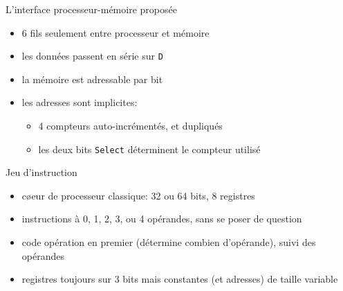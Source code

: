 \documentclass[slidetop,11pt,table]{beamer}
\begin{document}
\begin{frame}{L'interface processeur-mémoire proposée}
  \begin{figure}[b]
    \begin{center}
      \scalebox{0.8}{\proco}
    \end{center}
  \end{figure}
  \begin{itemize}
  \item 6 fils seulement entre processeur et mémoire
  \item les données passent en série sur \texttt{D}
  \item la mémoire est adressable par bit
  \item les adresses sont implicites:
    \begin{itemize}
    \item 4 compteurs auto-incrémentés, et dupliqués
    \item les deux bits \texttt{Select} déterminent le compteur utilisé
    \end{itemize}
  \end{itemize}
\end{frame}




\begin{frame}{Jeu d'instruction}
  \begin{itemize}
  \item c\o eur de processeur classique: 32 ou 64 bits, 8 registres
  \item instructions à 0, 1, 2, 3, ou 4 opérandes, sans se poser de question
  \item code opération en premier (détermine combien d'opérande), suivi des opérandes
  \item registres toujours sur 3 bits mais constantes (et adresses) de taille variable
  \end{itemize}
\end{frame}
\end{document}
